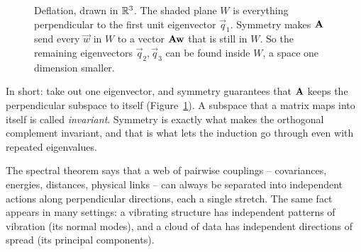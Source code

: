\begin{figure}[htbp]
\centering
{}
\caption{Deflation, drawn in $\mathbb{R}^3$. The shaded plane $W$ is everything
perpendicular to the first unit eigenvector $\vec{q}_1$. Symmetry makes $\mathbf{A}$
send every $\vec{w}$ in $W$ to a vector $\mathbf{A}\mathbf{w}$ that is still in $W$. So the
remaining eigenvectors $\vec{q}_2,\vec{q}_3$ can be found inside $W$, a space
one dimension smaller.}
\label{ch26:fig-deflation}
\end{figure}

In short: take out one eigenvector, and symmetry guarantees that $\mathbf{A}$ keeps
the perpendicular subspace to itself (Figure~\ref{ch26:fig-deflation}). A subspace
that a matrix maps into itself is called \emph{invariant}. Symmetry is exactly
what makes the orthogonal complement invariant, and that is what lets the
induction go through even with repeated eigenvalues.

\begin{aestheticbox}
The spectral theorem says that a web of pairwise couplings -- covariances,
energies, distances, physical links -- can always be separated into independent
actions along perpendicular directions, each a single stretch. The same fact
appears in many settings: a vibrating structure has independent patterns of
vibration (its normal modes), and a cloud of data has independent directions of
spread (its principal components).
\end{aestheticbox}

